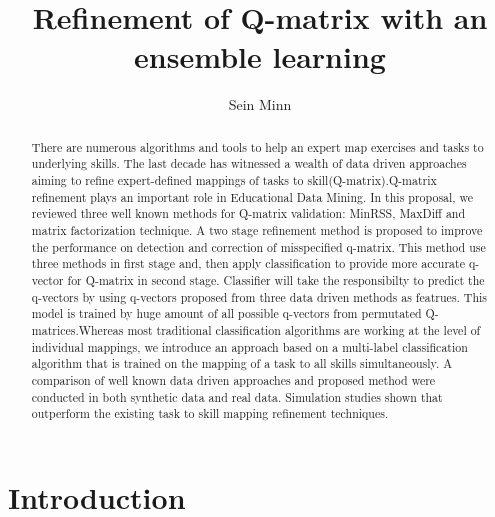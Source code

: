 \documentclass[11pt]{article}
\begin{document}
\title{Refinement of Q-matrix with an ensemble learning}
\author{Sein Minn}
\maketitle
\setlength{\parindent}{15pt}

\begin{abstract}
There are numerous algorithms and tools to help an expert map exercises and tasks to underlying skills. The last decade has witnessed a wealth of data driven approaches aiming to refine expert-defined
mappings of tasks to skill(Q-matrix).Q-matrix refinement plays an important role in Educational Data Mining. In this proposal, we reviewed three well known methods for Q-matrix validation: MinRSS, MaxDiff and matrix factorization technique. A two stage refinement method is proposed to improve the performance on detection and correction of misspecified q-matrix. This method use three methods in first stage and, then apply classification to provide more accurate q-vector for Q-matrix in second stage. Classifier will take the responsibilty to predict the q-vectors by using q-vectors proposed from three data driven methods as featrues. This model is trained by huge amount of all possible q-vectors from permutated Q-matrices.Whereas most traditional classification algorithms are working at the level of individual mappings, we introduce an approach based on a multi-label classification algorithm that is trained on the mapping of a task to all skills simultaneously. A comparison of well known data driven approaches and proposed method were conducted in both synthetic data and real data. Simulation studies shown that outperform the existing task to skill mapping refinement techniques. 
\end{abstract}

\section{Introduction}
\end{document}
